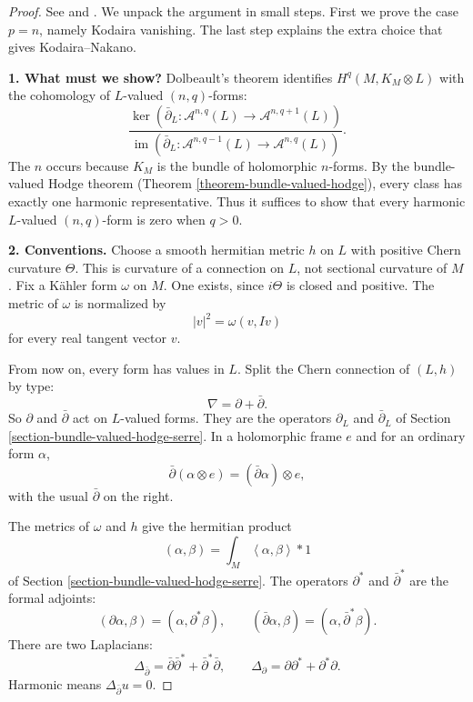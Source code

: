 \begin{proof}
See \cite[Proposition 5.2.2]{huc} and
\cite[p. 154]{gri}.
We unpack the argument in small steps.
First we prove the case $p=n$, namely
Kodaira vanishing. The last step explains
the extra choice that gives
Kodaira--Nakano.

\medskip\noindent
{\bf 1. What must we show?}
Dolbeault's theorem identifies
$H^q(M,K_M\otimes L)$ with the cohomology
of $L$-valued $(n,q)$-forms:
$$
\frac{
\ker(\bar\partial_L:
\mathcal A^{n,q}(L)
\to\mathcal A^{n,q+1}(L))}
{\operatorname{im}(\bar\partial_L:
\mathcal A^{n,q-1}(L)
\to\mathcal A^{n,q}(L))}.
$$
The $n$ occurs because $K_M$ is the
bundle of holomorphic $n$-forms.
By the bundle-valued Hodge theorem
(Theorem \ref{theorem-bundle-valued-hodge}),
every class has exactly one harmonic
representative.
Thus it suffices to show that every
harmonic $L$-valued $(n,q)$-form is zero
when $q>0$.

\medskip\noindent
{\bf 2. Conventions.}
Choose a smooth hermitian metric $h$
on $L$ with positive Chern curvature
$\Theta$. This is curvature of a
connection on $L$, not sectional
curvature of $M$.
Fix a Kähler form $\omega$ on $M$.
One exists, since $i\Theta$ is closed
and positive. The metric of $\omega$ is
normalized by
$$
|v|^2=\omega(v,Iv)
$$
for every real tangent vector $v$.

From now on, every form has values in
$L$. Split the Chern connection of
$(L,h)$ by type:
$$
\nabla=\partial+\bar\partial.
$$
So $\partial$ and $\bar\partial$ act on
$L$-valued forms. They are the operators
$\partial_L$ and $\bar\partial_L$ of
Section
\ref{section-bundle-valued-hodge-serre}.
In a holomorphic frame $e$ and for an
ordinary form $\alpha$,
$$
\bar\partial(\alpha\otimes e)
=(\bar\partial\alpha)\otimes e,
$$
with the usual $\bar\partial$ on the
right.

The metrics of $\omega$ and $h$ give
the hermitian product
$$
(\alpha,\beta)
=\int_M\left\langle{}
\alpha,\beta\right\rangle{}*1
$$
of Section
\ref{section-bundle-valued-hodge-serre}.
The operators $\partial^*$ and
$\bar\partial^*$ are the formal adjoints:
$$
(\partial\alpha,\beta)
=(\alpha,\partial^*\beta),
\qquad
(\bar\partial\alpha,\beta)
=(\alpha,\bar\partial^*\beta).
$$
There are two Laplacians:
$$
\Delta_{\bar\partial}
=\bar\partial\bar\partial^*
+\bar\partial^*\bar\partial,
\qquad
\Delta_{\partial}
=\partial\partial^*
+\partial^*\partial.
$$
Harmonic means
$\Delta_{\bar\partial}u=0$.


\end{proof}
